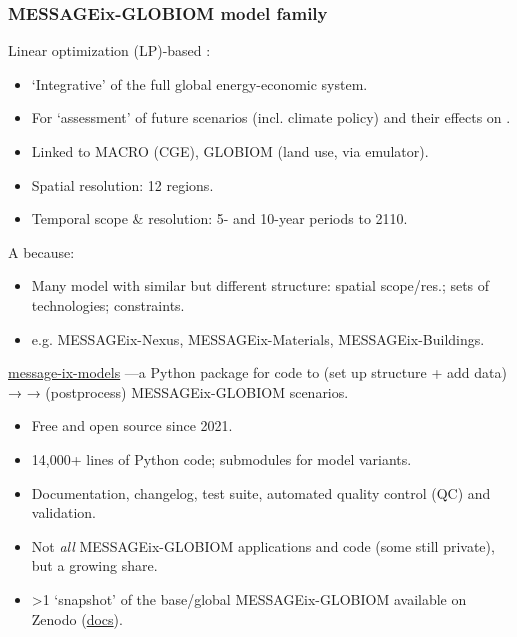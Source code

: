 \documentclass[12pt,aspectratio=169]{beamer}
\begin{document}
\begin{frame}[allowframebreaks]
\frametitle{MESSAGEix-GLOBIOM model family}
Linear optimization (LP)-based :
\begin{itemize}
  \item ‘Integrative’ of the full global energy-economic system.
  \item For ‘assessment’ of future scenarios (incl. climate policy) and their effects on .
  \item Linked to MACRO (CGE), GLOBIOM (land use, via emulator).
  \item Spatial resolution: 12 regions.
  \item Temporal scope \& resolution: 5- and 10-year periods to 2110.
\end{itemize}

\medskip
A  because:
\begin{itemize}
  \item Many model  with similar but different structure: spatial scope/res.; sets of technologies; constraints.
  \item e.g. MESSAGEix-Nexus, MESSAGEix-Materials, MESSAGEix-Buildings.
\end{itemize}

\framebreak
\href{https://github.com/iiasa/message-ix-models}{\ttfamily message-ix-models} —a Python package for code to  (set up structure + add data) →  →  (postprocess) MESSAGEix-GLOBIOM scenarios.
\begin{itemize}
  \item Free and open source since 2021.
  \item 14,000+ lines of Python code; submodules for model variants.
  \item Documentation, changelog, test suite, automated quality control (QC) and validation.
  \item Not \emph{all} MESSAGEix-GLOBIOM applications and code (some still private), but a growing share.
  \item >1 ‘snapshot’ of the base/global MESSAGEix-GLOBIOM available on Zenodo (\href{https://docs.messageix.org/projects/models/en/latest/api/model-snapshot.html}{docs}).
\end{itemize}

\end{frame}
\end{document}
